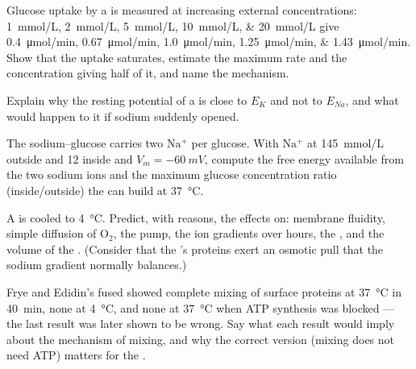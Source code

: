 \begin{exercise}[$\star\star$]\label{exo:b1:membranes-transport:7}
Glucose uptake by a  is measured at increasing external
concentrations: \qtylist{1;2;5;10;20}{mmol/L} give
\qtylist{0.4;0.67;1.0;1.25;1.43}{\micro mol/min}. Show that the uptake
saturates, estimate the maximum rate and the concentration giving half
of it, and name the mechanism.
\end{exercise}

\begin{exercise}[$\star\star$]\label{exo:b1:membranes-transport:8}
Explain why the resting potential of a  is close to $E_K$ and not
to $E_{Na}$, and what would happen to it if sodium  suddenly
opened.
\end{exercise}

\begin{exercise}[$\star\star$]\label{exo:b1:membranes-transport:9}
The sodium--glucose  carries two $\mathrm{Na^+}$ per glucose.
With $\mathrm{Na^+}$ at \qty{145}{mmol/L} outside and \qty{12}{} inside
and $V_m = \qty{-60}{mV}$, compute the free energy available from the
two sodium ions and the maximum glucose concentration ratio
(inside/outside) the  can build at \qty{37}{\celsius}.
\end{exercise}

\begin{exercise}[$\star\star\star$]\label{exo:b1:membranes-transport:10}
A  is cooled to \qty{4}{\celsius}. Predict, with reasons, the
effects on: membrane fluidity, simple diffusion of $\mathrm{O_2}$, the
pump, the ion gradients over hours, the , and the
volume of the . (Consider that the 's proteins exert an
osmotic pull that the sodium gradient normally balances.)
\end{exercise}

\begin{exercise}[$\star\star\star$]\label{exo:b1:membranes-transport:11}
Frye and Edidin's fused  showed complete mixing of surface
proteins at \qty{37}{\celsius} in \qty{40}{min}, none at
\qty{4}{\celsius}, and none at \qty{37}{\celsius} when ATP synthesis was
blocked --- the last result was later shown to be wrong. Say what each
result would imply about the mechanism of mixing, and why the correct
version (mixing does not need ATP) matters for the .
\end{exercise}

